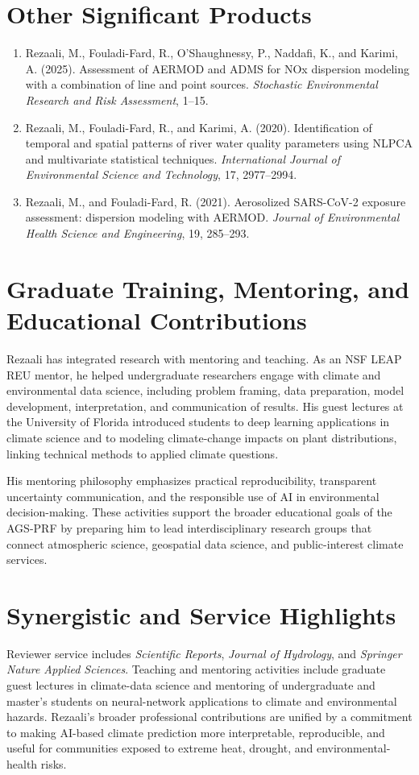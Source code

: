 \documentclass[11pt,letterpaper]{article}
\begin{document}
\section*{Other Significant Products}
\begin{enumerate}
\item Rezaali, M., Fouladi-Fard, R., O'Shaughnessy, P., Naddafi, K., and Karimi, A. (2025). Assessment of AERMOD and ADMS for NOx dispersion modeling with a combination of line and point sources. \textit{Stochastic Environmental Research and Risk Assessment}, 1--15.
\item Rezaali, M., Fouladi-Fard, R., and Karimi, A. (2020). Identification of temporal and spatial patterns of river water quality parameters using NLPCA and multivariate statistical techniques. \textit{International Journal of Environmental Science and Technology}, 17, 2977--2994.
\item Rezaali, M., and Fouladi-Fard, R. (2021). Aerosolized SARS-CoV-2 exposure assessment: dispersion modeling with AERMOD. \textit{Journal of Environmental Health Science and Engineering}, 19, 285--293.
\end{enumerate}

\section*{Graduate Training, Mentoring, and Educational Contributions}
Rezaali has integrated research with mentoring and teaching. As an NSF LEAP REU mentor, he helped undergraduate researchers engage with climate and environmental data science, including problem framing, data preparation, model development, interpretation, and communication of results. His guest lectures at the University of Florida introduced students to deep learning applications in climate science and to modeling climate-change impacts on plant distributions, linking technical methods to applied climate questions.

His mentoring philosophy emphasizes practical reproducibility, transparent uncertainty communication, and the responsible use of AI in environmental decision-making. These activities support the broader educational goals of the AGS-PRF by preparing him to lead interdisciplinary research groups that connect atmospheric science, geospatial data science, and public-interest climate services.

\section*{Synergistic and Service Highlights}
Reviewer service includes \textit{Scientific Reports}, \textit{Journal of Hydrology}, and \textit{Springer Nature Applied Sciences}. Teaching and mentoring activities include graduate guest lectures in climate-data science and mentoring of undergraduate and master's students on neural-network applications to climate and environmental hazards. Rezaali's broader professional contributions are unified by a commitment to making AI-based climate prediction more interpretable, reproducible, and useful for communities exposed to extreme heat, drought, and environmental-health risks.
\end{document}
